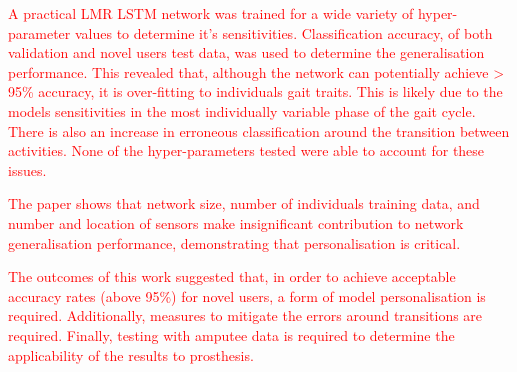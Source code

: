 \documentclass[sensors,article,submit,moreauthors,pdftex]{Definitions/mdpi}
\begin{document}
\textcolor{red}{A practical LMR LSTM network was trained for a wide variety of hyper-parameter values to determine it's sensitivities. Classification accuracy, of both validation and novel users test data, was used to determine the generalisation performance. This revealed that, although the network can potentially achieve > 95\% accuracy, it is over-fitting to individuals gait traits. This is likely due to the models sensitivities in the most individually variable phase of the gait cycle. There is also an increase in erroneous classification around the transition between activities. None of the hyper-parameters tested were able to account for these issues.}

\textcolor{red}{The paper shows that network size, number of individuals training data, and number and location of sensors make insignificant contribution to network generalisation performance, demonstrating that personalisation is critical.}

\textcolor{red}{The outcomes of this work suggested that, in order to achieve acceptable accuracy rates (above 95\%) for novel users, a form of model personalisation is required. Additionally, measures to mitigate the errors around transitions are required. Finally, testing with amputee data is required to determine the applicability of the results to prosthesis.}

\vspace{6pt} 


\end{document}

